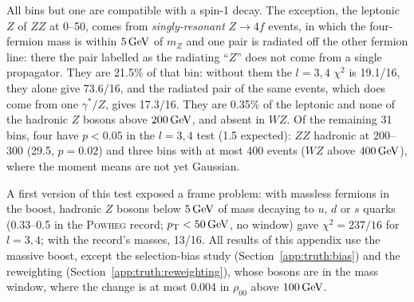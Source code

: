 All bins but one are compatible with a spin-1 decay. The exception, the leptonic $Z$ of $ZZ$ at 0--50\GeV, comes from
\emph{singly-resonant} $Z \to 4f$ events, in which the four-fermion mass is within $5\,\mathrm{GeV}$ of $m_Z$ and one pair is
radiated off the other fermion line: there the pair labelled as the radiating ``$Z$'' does not come from a single
propagator. They are 21.5\% of that bin: without them the $l = 3, 4$ $\chi^2$ is 19.1/16, they alone give 73.6/16,
and the radiated pair of the same events, which does come from one $\gamma^*/Z$, gives 17.3/16. They are 0.35\% of the
leptonic and none of the hadronic $Z$ bosons above $200\,\mathrm{GeV}$, and absent in $WZ$. Of the remaining 31 bins, four have
$p < 0.05$ in the $l = 3, 4$ test (1.5 expected): $ZZ$ hadronic at 200--300\GeV{} (29.5, $p = 0.02$) and three bins
with at most 400 events ($WZ$ above $400\,\mathrm{GeV}$), where the moment means are not yet Gaussian.

A first version of this test exposed a frame problem: with massless fermions in the boost, hadronic $Z$ bosons below
$5\,\mathrm{GeV}$ of mass decaying to $u$, $d$ or $s$ quarks (0.33--0.5\GeV{} in the \textsc{Powheg} record; $p_{\mathrm{T}} < 50\,\mathrm{GeV}$, no
window) gave $\chi^2 = 237/16$ for $l = 3, 4$; with the record's masses, 13/16. All results of this appendix use the massive boost, except the selection-bias study
(Section~\ref{app:truth:bias}) and the reweighting (Section~\ref{app:truth:reweighting}), whose bosons are in the mass
window, where the change is at most 0.004 in $\rho_{00}$ above $100\,\mathrm{GeV}$.

